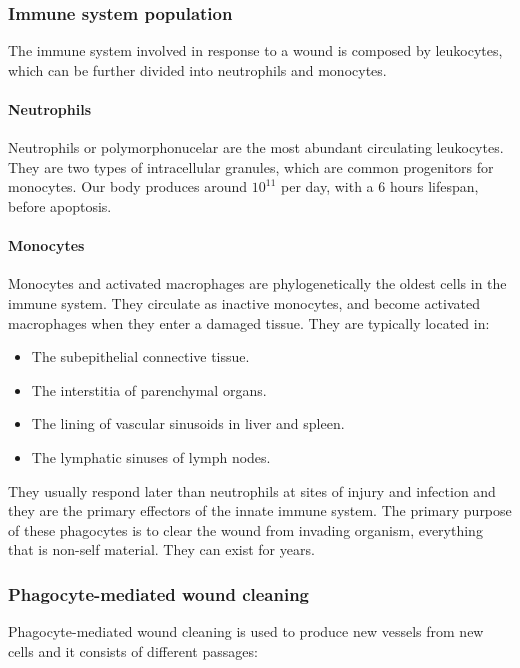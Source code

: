 		\subsubsection{Immune system population}
		The immune system involved in response to a wound is composed by leukocytes, which can be further divided into neutrophils and monocytes.

			\paragraph{Neutrophils}
			Neutrophils or polymorphonucelar are the most abundant circulating leukocytes.
			They are two types of intracellular granules, which are common progenitors for monocytes.
			Our body produces around $10^{11}$ per day, with a $6$ hours lifespan, before apoptosis.

			\paragraph{Monocytes}
			Monocytes and activated macrophages are phylogenetically the oldest cells in the immune system.
			They circulate as inactive monocytes, and become activated macrophages when they enter a damaged tissue.
			They are typically located in:

			\begin{multicols}{2}
				\begin{itemize}
					\item The subepithelial connective tissue.
					\item The interstitia of parenchymal organs.
					\item The lining of vascular sinusoids in liver and spleen.
					\item The lymphatic sinuses of lymph nodes.
				\end{itemize}
			\end{multicols}

			They usually respond later than neutrophils at sites of injury and infection and they are the primary effectors of the innate immune system.
			The primary purpose of these phagocytes is to clear the wound from invading organism, everything that is non-self material.
			They can exist for years.

		\subsubsection{Phagocyte-mediated wound cleaning}
		Phagocyte-mediated wound cleaning is used to produce new vessels from new cells and it consists of different passages:

